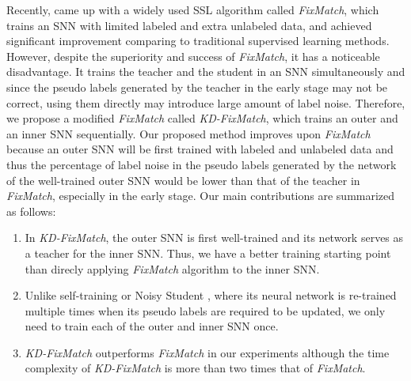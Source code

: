 \documentclass{article}
\begin{document}
Recently, \cite{KS20a} came up with a widely used SSL algorithm called {\sl FixMatch}, which trains an SNN with limited labeled and extra unlabeled data,
and achieved significant improvement comparing to traditional supervised learning methods.
However, despite the superiority and success of {\sl FixMatch}, it has a noticeable disadvantage.
It trains the teacher and the student in an SNN simultaneously and since the pseudo labels generated by the teacher in the early stage may not be correct, using them directly may introduce large amount of label noise.
Therefore, we propose a modified {\sl FixMatch} called {\sl KD-FixMatch}, which trains an outer and an inner SNN sequentially.
Our proposed method improves upon {\sl FixMatch} because an outer SNN will be first trained with labeled and unlabeled data and thus
the percentage of label noise in the pseudo labels generated by the network of the well-trained outer SNN would be lower than that of the teacher in {\sl FixMatch}, especially in the early stage.
Our main contributions are summarized as follows:
\vspace{-2.0mm}
\begin{enumerate}[1.]
    \item
        In {\sl KD-FixMatch}, the outer SNN is first well-trained and its network serves as a teacher for the inner SNN.
        Thus, we have a better training starting point than direcly applying {\sl FixMatch} algorithm to the inner SNN.
    \vspace{-2.0mm}
    \item
        Unlike self-training \cite{DY95a,DM06a} or Noisy Student \cite{QX20a}, where its neural network is re-trained multiple times when its pseudo labels are required to be updated,
        we only need to train each of the outer and inner SNN once.
    \vspace{-2.0mm}
    \item
        {\sl KD-FixMatch} outperforms {\sl FixMatch} in our experiments
        although the time complexity of {\sl KD-FixMatch} is more than two times that of {\sl FixMatch}.
    \vspace{-2.0mm}
\end{enumerate}
\end{document}
